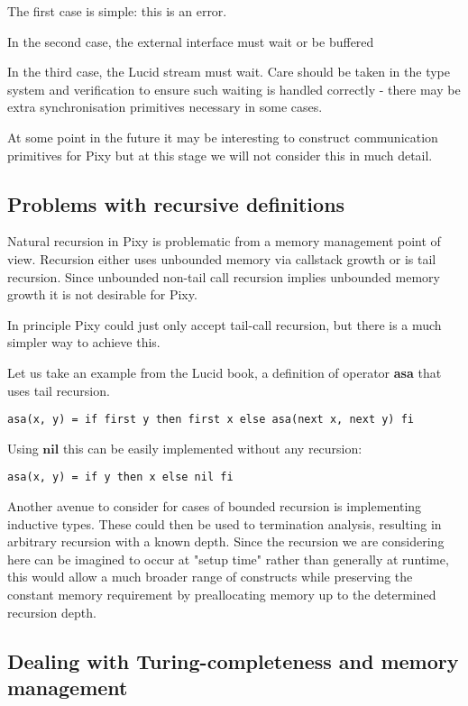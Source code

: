 \documentclass{scrartcl}
\begin{document}
    The first case is simple: this is an error.
    
    In the second case, the external interface must wait or be buffered
    
    In the third case, the Lucid stream must wait. Care should be taken in the type system and verification to ensure such waiting is handled correctly - there may be extra synchronisation primitives necessary in some cases.
    
    At some point in the future it may be interesting to construct communication primitives for Pixy but at this stage we will not consider this in much detail.

    \subsection{Problems with recursive definitions}
    
    Natural recursion in Pixy is problematic from a memory management point of view. Recursion either uses unbounded memory via callstack growth or is tail recursion. Since unbounded non-tail call recursion implies unbounded memory growth it is not desirable for Pixy.
    
    In principle Pixy could just only accept tail-call recursion, but there is a much simpler way to achieve this.
    
    Let us take an example from the Lucid book, a definition of operator \textbf{asa} that uses tail recursion.
    \begin{lstlisting}
asa(x, y) = if first y then first x else asa(next x, next y) fi
    \end{lstlisting}
    
    Using $\textbf{nil}$ this can be easily implemented without any recursion:
    \begin{lstlisting}
asa(x, y) = if y then x else nil fi
    \end{lstlisting}
    
    Another avenue to consider for cases of bounded recursion is implementing inductive types. These could then be used to termination analysis, resulting in arbitrary recursion with a known depth. Since the recursion we are considering here can be imagined to occur at "setup time" rather than generally at runtime, this would allow a much broader range of constructs while preserving the constant memory requirement by preallocating memory up to the determined recursion depth.
    
    \subsection{Dealing with Turing-completeness and memory management}
    
\end{document}
